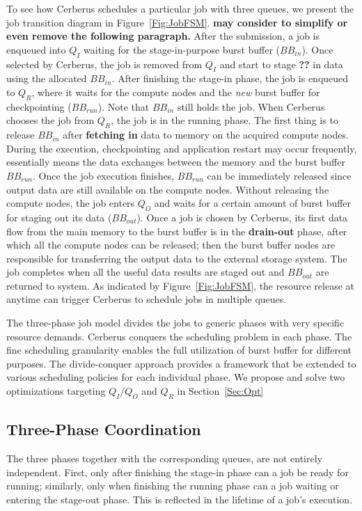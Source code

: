 To see how Cerberus schedules a particular job with three queues,
we present the job transition diagram in Figure~\ref{Fig:JobFSM}. \textbf{may consider to simplify or even remove the following paragraph.}
After the submission, a job is enqueued into $Q_I$ waiting for the stage-in-purpose burst buffer ($BB_{in}$).
Once selected by Cerberus, the job is removed from $Q_I$ and start to stage \textbf{??} in data using the allocated $BB_{in}$.
After finishing the stage-in phase, the job is enqueued to $Q_R$, where it waits for the compute nodes and the \textit{new} burst buffer for checkpointing ($BB_{run}$).
Note that $BB_{in}$ still holds the job. When Cerberus chooses the job from $Q_R$, the job is in the running phase.
The first thing is to release $BB_{in}$ after \textbf{fetching in} data to memory on the acquired compute nodes.
During the execution, checkpointing and application restart may occur frequently, essentially means the data exchanges between the memory and the burst buffer $BB_{run}$.
Once the job execution finishes, $BB_{run}$ can be immediately released since
output data are still available on the compute nodes.
Without releasing the compute nodes, the job enters $Q_O$ and waits for a certain amount of burst buffer for staging out its data ($BB_{out}$).
Once a job is chosen by Cerberus, its first data flow from the main memory to the burst buffer is 
in the \textbf{drain-out} phase, after which all the compute nodes can be released;
then the burst buffer nodes are responsible for transferring the output data to the external storage system.
The job completes when all the useful data results are staged out and $BB_{out}$ are returned to system.
As indicated by Figure~\ref{Fig:JobFSM}, the resource release at anytime can trigger Cerberus
to schedule jobs in multiple queues.

The three-phase job model divides the jobs to generic phases with very specific resource demands.
Cerberus conquers the scheduling problem in each phase.
The fine scheduling granularity enables the full utilization of burst buffer for different purposes.
The divide-conquer approach provides a framework that be extended to various scheduling
policies for each individual phase. We propose and solve two optimizations targeting $Q_I/Q_O$ and $Q_R$ in Section~\ref{Sec:Opt}

\subsection{Three-Phase Coordination}
The three phases together with the corresponding queues, are not entirely independent.
First, only after finishing the stage-in phase can a job be ready for running;
similarly, only when finishing the running phase can a job waiting or entering the stage-out phase.
This is reflected in the lifetime of a job's execution.

